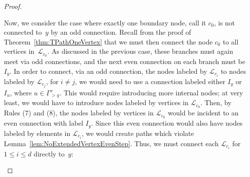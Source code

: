 \documentclass[pdftex]{sigma}
\numberwithin{equation}{section}
\newcommand{\new}[1]{{#1}}
\begin{document}
\begin{proof}
\begin{center}
\end{center}
Now, we consider the case where exactly one boundary node, call it $c_0$, is not connected to~$y$ by an odd connection. Recall from the proof of Theorem~\ref{thm:TPathOneVertex} that we must then connect the node $c_0$ to all vertices in~$\mathcal{L}_{c_0}$.
As discussed in the previous case, these branches must again meet via odd connections, and the next even connection on each branch must be $I_y$. In order to connect, via an odd connection, the nodes labeled by $\mathcal{L}_{c_i}$ to nodes labeled by $\mathcal{L}_{c_j}$, for $i \neq j$, we would need to use a connection labeled either $I_y$ or $I_u$, where $u\in\Gamma_{> y}^v$. This would require introducing more internal nodes; at very least, we would have to introduce nodes labeled by vertices in $\mathcal{L}_{c_0}$. Then, by Rules \new{(7) and (8)}, the nodes labeled by vertices in $\mathcal{L}_{c_0}$ would be incident to an even connection with label $I_y$. Since this even connection would also have nodes labeled by elements in $\mathcal{L}_{c_i}$, we would create paths which violate Lemma~\ref{lem:NoExtendedVertexEvenStep}. Thus, we must connect each $\mathcal{L}_{c_i}$ for $1 \leq i\leq d$ directly to~$y$:
\begin{center}
\end{center}
\end{proof}
\end{document}
